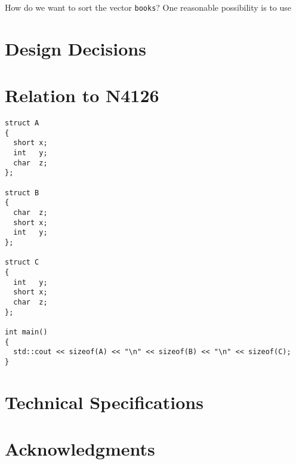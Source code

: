 ﻿\documentclass[a4paper,11pt,final]{article}
\newcommand{\tcode}[1]{\lstinline{#1}}
\begin{document}
How do we want to sort the vector \tcode{books}? One reasonable possibility is to use 


\section{Design Decisions}

\section{Relation to N4126}
\cite{oleg3}\cite{oleg1}\cite{oleg2}
\begin{lstlisting}
struct A
{
  short x;
  int   y;
  char  z;
};

struct B
{
  char  z;
  short x;
  int   y; 
};

struct C
{
  int   y;
  short x;
  char  z;
};

int main()
{
  std::cout << sizeof(A) << "\n" << sizeof(B) << "\n" << sizeof(C);
}
\end{lstlisting}

\section{Technical Specifications}

\section{Acknowledgments}



\end{document}
